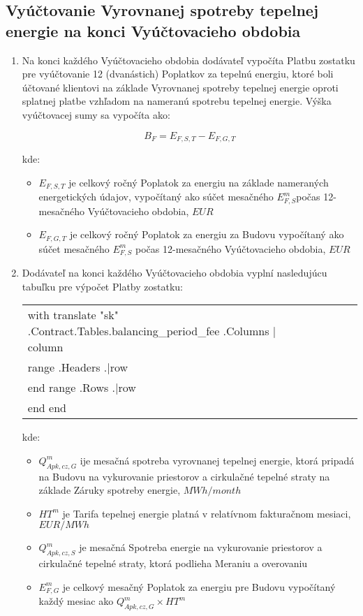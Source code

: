 \subsection{Vyúčtovanie Vyrovnanej spotreby tepelnej energie na konci Vyúčtovacieho obdobia}
\begin{enumerate}
	\item Na konci každého Vyúčtovacieho obdobia dodávateľ vypočíta Platbu zostatku pre vyúčtovanie 12 (dvanástich) Poplatkov za tepelnú energiu, ktoré boli účtované klientovi na základe Vyrovnanej spotreby tepelnej energie oproti splatnej platbe vzhľadom na nameranú spotrebu tepelnej energie. Výška vyúčtovacej sumy sa vypočíta ako:

\[ B_F = E_{F,S,T} - E_{F,G,T} \]

kde:

\begin{itemize}
	\item $E_{F,S,T}$ je celkový ročný Poplatok za energiu na základe nameraných energetických údajov, vypočítaný ako súčet mesačného $E^{m}_{F,S}$počas 12-mesačného Vyúčtovacieho obdobia, $EUR$ 
	\item $E_{F,G,T}$ je celkový ročný Poplatok za energiu za Budovu vypočítaný ako súčet mesačného $E^{m}_{F,S}$  počas 12-mesačného Vyúčtovacieho obdobia, $EUR$
\end{itemize}

	\item Dodávateľ na konci každého Vyúčtovacieho obdobia vyplní nasledujúcu tabuľku pre výpočet Platby zostatku:


\begin{center}
\begin{tabu}{|X|X|X|X|X|X|X|} \tabucline{}
{{with translate "sk" .Contract.Tables.balancing_period_fee}} %
	{{.Columns | column}} \\\tabucline{}
	{{range .Headers}} {{.|row}} \\\tabucline{} {{end}} %
	{{range .Rows}} {{.|row}} \\\tabucline{} {{end}} %
{{end}}
\end{tabu}
\end{center}

kde:

\begin{itemize}
	\item $Q^{m}_{Apk,cz,G}$ ije mesačná spotreba vyrovnanej tepelnej energie, ktorá pripadá na Budovu na vykurovanie priestorov a cirkulačné tepelné straty na základe Záruky spotreby energie, $MWh/month$
	\item $HT^m$ je Tarifa tepelnej energie platná v relatívnom fakturačnom mesiaci,  $EUR/MWh$
	\item $Q^m_{Apk,cz,S}$ je mesačná Spotreba energie na vykurovanie priestorov a cirkulačné tepelné straty, ktorá podlieha Meraniu a overovaniu
	\item $E^m_{F,G}$ je celkový mesačný Poplatok za energiu pre Budovu vypočítaný každý mesiac ako $Q^{m}_{Apk,cz,G} \times HT^{m}$
\end{itemize}


\end{enumerate}
